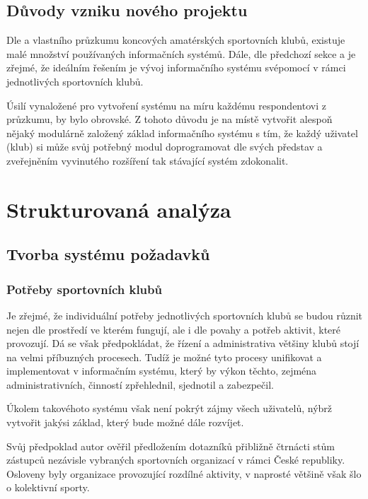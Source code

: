 \documentclass[11pt,oneside]{fithesis}
\begin{document}
\section{Důvody vzniku nového projektu}
Dle \cite{analyza-sis} a vlastního průzkumu koncových amatérských sportovních klubů, existuje malé množství používaných informačních systémů. Dále, dle předchozí sekce a \cite{analyza-sis} je zřejmé, že ideálním řešením je vývoj informačního systému svépomocí v rámci jednotlivých sportovních klubů.

Úsilí vynaložené pro vytvoření systému na míru každému respondentovi z průzkumu, by bylo obrovské. Z tohoto důvodu je na místě vytvořit alespoň nějaký modulárně založený základ informačního systému s tím, že každý uživatel (klub) si může svůj potřebný modul doprogramovat dle svých představ a zveřejněním vyvinutého rozšíření tak stávající systém zdokonalit.










\chapter{Strukturovaná analýza}

        \section{Tvorba systému požadavků}

                \subsection{Potřeby sportovních klubů}
                Je zřejmé, že individuální potřeby jednotlivých sportovních klubů se budou různit nejen dle prostředí ve kterém fungují, ale i dle povahy a potřeb aktivit, které provozují. Dá se však předpokládat, že řízení a administrativa většiny klubů stojí na velmi příbuzných procesech. Tudíž je možné tyto procesy unifikovat a implementovat v informačním systému, který by výkon těchto, zejména administrativních, činností zpřehlednil, sjednotil a zabezpečil. 

                Úkolem takovéhoto systému však není pokrýt zájmy všech uživatelů, nýbrž vytvořit jakýsi základ, který bude možné dále rozvíjet.

                Svůj předpoklad autor ověřil předložením dotazníků přibližně čtrnácti stům zástupců nezávisle vybraných sportovních organizací v rámci České republiky. Osloveny byly organizace provozující rozdílné aktivity, v naprosté většině však šlo o kolektivní sporty. 
\end{document}
